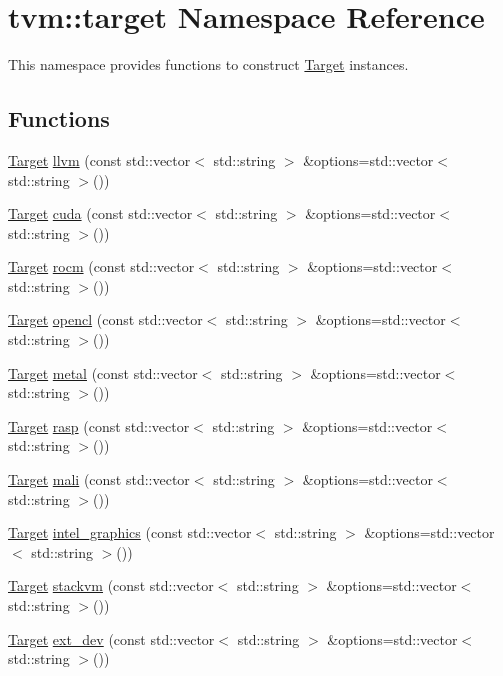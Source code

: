 \hypertarget{namespacetvm_1_1target}{}\section{tvm\+:\+:target Namespace Reference}
\label{namespacetvm_1_1target}


This namespace provides functions to construct \hyperlink{classtvm_1_1Target}{Target} instances.  


\subsection*{Functions}
\begin{DoxyCompactItemize}
\item 
\hyperlink{classtvm_1_1Target}{Target} \hyperlink{namespacetvm_1_1target_a8d851f48166f0f7ccf3c709e6271cb7d}{llvm} (const std\+::vector$<$ std\+::string $>$ \&options=std\+::vector$<$ std\+::string $>$())
\item 
\hyperlink{classtvm_1_1Target}{Target} \hyperlink{namespacetvm_1_1target_ae035a32c24d135c0ba65303bdbd87416}{cuda} (const std\+::vector$<$ std\+::string $>$ \&options=std\+::vector$<$ std\+::string $>$())
\item 
\hyperlink{classtvm_1_1Target}{Target} \hyperlink{namespacetvm_1_1target_afd36efca8e3ce77399559195d9e79a4a}{rocm} (const std\+::vector$<$ std\+::string $>$ \&options=std\+::vector$<$ std\+::string $>$())
\item 
\hyperlink{classtvm_1_1Target}{Target} \hyperlink{namespacetvm_1_1target_a34d788fb3230e4631e0a90430063c5d1}{opencl} (const std\+::vector$<$ std\+::string $>$ \&options=std\+::vector$<$ std\+::string $>$())
\item 
\hyperlink{classtvm_1_1Target}{Target} \hyperlink{namespacetvm_1_1target_a95b77120d71f2fde84f95f9d01252834}{metal} (const std\+::vector$<$ std\+::string $>$ \&options=std\+::vector$<$ std\+::string $>$())
\item 
\hyperlink{classtvm_1_1Target}{Target} \hyperlink{namespacetvm_1_1target_a020e427a235a2cc54c1c997a5567e595}{rasp} (const std\+::vector$<$ std\+::string $>$ \&options=std\+::vector$<$ std\+::string $>$())
\item 
\hyperlink{classtvm_1_1Target}{Target} \hyperlink{namespacetvm_1_1target_ae53344656c8a18717e2b75823a4e7308}{mali} (const std\+::vector$<$ std\+::string $>$ \&options=std\+::vector$<$ std\+::string $>$())
\item 
\hyperlink{classtvm_1_1Target}{Target} \hyperlink{namespacetvm_1_1target_aaa091303c33c4a354097be9ac7e2e4f8}{intel\+\_\+graphics} (const std\+::vector$<$ std\+::string $>$ \&options=std\+::vector$<$ std\+::string $>$())
\item 
\hyperlink{classtvm_1_1Target}{Target} \hyperlink{namespacetvm_1_1target_a786980129073f38d1f1355f92da2b8da}{stackvm} (const std\+::vector$<$ std\+::string $>$ \&options=std\+::vector$<$ std\+::string $>$())
\item 
\hyperlink{classtvm_1_1Target}{Target} \hyperlink{namespacetvm_1_1target_a1fece6d42e0638ab5cd4b6c364c47984}{ext\+\_\+dev} (const std\+::vector$<$ std\+::string $>$ \&options=std\+::vector$<$ std\+::string $>$())
\end{DoxyCompactItemize}


